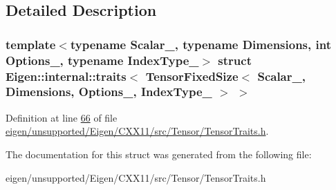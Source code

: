 \subsection{Detailed Description}
\subsubsection*{template$<$typename Scalar\+\_\+, typename Dimensions, int Options\+\_\+, typename Index\+Type\+\_\+$>$\newline
struct Eigen\+::internal\+::traits$<$ Tensor\+Fixed\+Size$<$ Scalar\+\_\+, Dimensions, Options\+\_\+, Index\+Type\+\_\+ $>$ $>$}



Definition at line \hyperlink{eigen_2unsupported_2_eigen_2_c_x_x11_2src_2_tensor_2_tensor_traits_8h_source_l00066}{66} of file \hyperlink{eigen_2unsupported_2_eigen_2_c_x_x11_2src_2_tensor_2_tensor_traits_8h_source}{eigen/unsupported/\+Eigen/\+C\+X\+X11/src/\+Tensor/\+Tensor\+Traits.\+h}.



The documentation for this struct was generated from the following file\+:\begin{DoxyCompactItemize}
\item 
eigen/unsupported/\+Eigen/\+C\+X\+X11/src/\+Tensor/\+Tensor\+Traits.\+h\end{DoxyCompactItemize}
